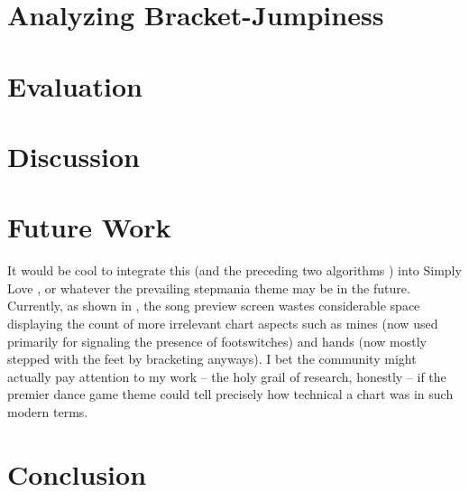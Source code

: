 \documentclass[10pt]{sigplanconf}
\begin{document}
\section{Analyzing Bracket-Jumpiness}



\section{Evaluation}



\section{Discussion}

\section{Future Work}

It would be cool to integrate this (and the preceding two algorithms \cite{turniness,crossoveriness})
into Simply Love \cite{simplylove}, or whatever the prevailing stepmania theme may be in the future.
Currently, as shown in , %
the song preview screen wastes considerable space displaying the count of more irrelevant chart aspects
such as mines (now used primarily for signaling the presence of footswitches)
and hands (now mostly stepped with the feet by bracketing anyways).
I bet the community might actually pay attention to my work -- the holy grail of research, honestly --
if the premier dance game theme could tell precisely how technical a chart was in such modern terms.

\section{Conclusion}






\end{document}

